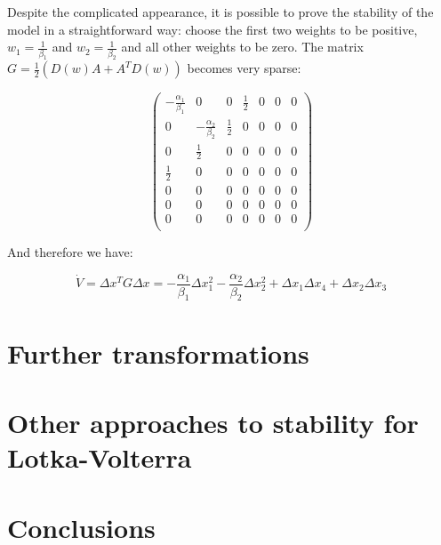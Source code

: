 \documentclass{article}
\begin{document}
Despite the complicated appearance, it is possible to prove the
stability of the model in a straightforward way: choose the first two
weights to be positive, \(w_1 = \frac{1}{\beta_1}\) and
\(w_2 = \frac{1}{\beta_2}\) and all other weights to be zero. The matrix
\(G = \frac{1}{2}(D(w)A + A^T D(w))\) becomes very sparse:

\begin{equation}
\begin{pmatrix}
 -\frac{\alpha_1}{\beta_1} & 0 & 0 & \frac{1}{2} & 0 & 0 & 0 \\
 0 & -\frac{\alpha_2}{\beta_2} & \frac{1}{2} & 0 & 0 & 0 & 0 \\
 0 & \frac{1}{2} & 0 & 0 & 0 & 0 & 0 \\
 \frac{1}{2} & 0 & 0 & 0 & 0 & 0 & 0 \\
 0 & 0 & 0 & 0 & 0 & 0 & 0 \\
 0 & 0 & 0 & 0 & 0 & 0 & 0 \\
 0 & 0 & 0 & 0 & 0 & 0 & 0 \\
 \end{pmatrix}
\end{equation}

And therefore we have:

\begin{equation}
\dot{V} = \Delta x^T G \Delta x = -\frac{\alpha_1}{\beta_1} \Delta x_1^2 -\frac{\alpha_2}{\beta_2} \Delta x_2^2 + \Delta x_1 \Delta x_4 + \Delta x_2 \Delta x_3
\end{equation}

\hypertarget{further-transformations}{%
\section{Further transformations}\label{further-transformations}}

\hypertarget{other-approaches-to-stability-for-lotka-volterra}{%
\section{Other approaches to stability for
Lotka-Volterra}\label{other-approaches-to-stability-for-lotka-volterra}}

\hypertarget{conclusions}{%
\section*{Conclusions}\label{conclusions}}
\end{document}
